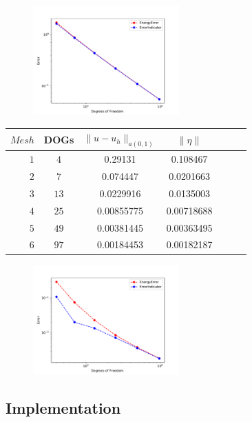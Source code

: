 \documentclass{uonmathreport}
\theoremstyle{definition}
\theoremstyle{problem}
\theoremstyle{theorem}
\begin{document}
\begin{figure}[h]
   \includegraphics[width=0.5\textwidth]{IndicatorPDE1.pdf}
   
 \label{fig:IndicatorPDE1}
\end{figure}

\begin{center}
  \begin{tabular}{r|cccccc}  \label{table:IndicatorPDE2}
    $Mesh$   & DOGs & $\|u-u_h\|_{a(0,1)}$ & $\|\eta\|$  \\ \hline
    $1$ & $4$ & 0.29131 &  0.108467   \\
    $2$ & $7$ & 0.074447 &  0.0201663   \\
    $3$ & $13$ & 0.0229916 & 0.0135003   \\
	$4$ & $25$ & 0.00855775 &  0.00718688  \\
    $5$ & $49$ & 0.00381445 &  0.00363495   \\
    $6$ & $97$ & 0.00184453 &  0.00182187  \\
  \end{tabular}
\end{center}



\begin{figure}[h]
   \includegraphics[width=0.5\textwidth]{IndicatorPDE2.pdf}
   
 \label{fig:IndicatorPDE1}
\end{figure}

\subsection{Implementation} \label{subsubsec:KK Implementation}
\end{document}
